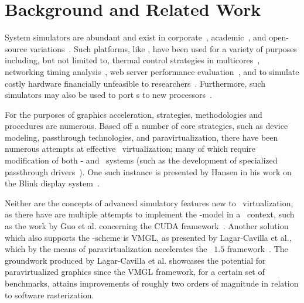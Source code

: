 
\chapter{Background and Related Work}
\label{cha:backgroundandrelatedwork}
System simulators are abundant and exist in corporate~, academic~, and open-source variations~.
Such platforms, like \dvttermsimics , have been used for a variety of purposes including, but not limited to, thermal control strategies in multicores~, networking timing analysis~, web server performance evaluation~, and to simulate costly hardware financially unfeasible to researchers~.
Furthermore, such simulators may also be used to port \dvttermos s to new processors~.

For the purposes of graphics acceleration, strategies, methodologies and procedures are numerous.
Based off a number of core strategies, such as device modeling, passthrough technologies, and paravirtualization, there have been numerous attempts at effective \dvttermgpu\ virtualization; many of which require modification of both \dvttermtarget - and \dvttermhost\ systems (such as the development of specialized passthrough drivers~).
One such instance is presented by Hansen in his work on the Blink display system~.

Neither are the concepts of advanced simulatory features new to \dvttermgpu\ virtualization, as there have are multiple attempts to implement the \dvttermcheckpointrestart -model in a \dvttermgpu\ context, such as the work by Guo et al. concerning the CUDA framework~.
Another solution which also supports the \dvttermcheckpointrestart -scheme is VMGL, as presented by Lagar-Cavilla et al., which by the means of paravirtualization accelerates the \dvttermopengl\ $1.5$ framework~.
The groundwork produced by Lagar-Cavilla et al. showcases the potential for paravirtualized graphics since the VMGL framework, for a certain set of benchmarks, attains improvements of roughly two orders of magnitude in relation to software rasterization.

